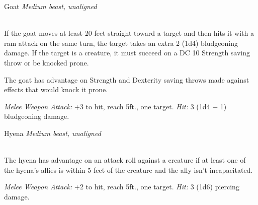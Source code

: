 \documentclass[10pt,twoside,twocolumn,openany]{book}
\begin{document}
\newpage
\begin{monsterboxnobg}{Goat}
	\textit{Medium beast, unaligned}\\
	\hline
	\basics[
		armorclass	= 10,
		hitpoints 		= 4 (1d8),
		speed		= {40 ft.}
	]
	\hline
	\stats[
		STR	= \stat{12},
		DEX	= \stat{10},
		CON	= \stat{11},
		INT	= \stat{2},
		WIS	= \stat{10},
		CHA	= \stat{5}
	]
	\hline
	\details[
		skills			= {},
		senses		= {passive Perception 10},
		languages		= {-},
		challenge		= 0
	]
	\hline \\[1mm]
	\begin{monsteraction}[Charge]
		 If the goat moves at least 20 feet straight toward a target and then hits it with a ram attack on the same turn, the target takes an extra 2 (1d4) bludgeoning damage. If the target is a creature, it must succeed on a DC 10 Strength saving throw or be knocked prone.
	\end{monsteraction}
	
	\begin{monsteraction}
		 The goat has advantage on Strength and Dexterity saving throws made against effects that would knock it prone.
	\end{monsteraction}
	
	\begin{monsteraction}[Ram]
		\textit{Melee Weapon Attack:} +3 to hit, reach 5ft., one target. \textit{Hit:} 3 (1d4 + 1) bludgeoning damage.
	\end{monsteraction}
\end{monsterboxnobg}

\begin{monsterboxnobg}{Hyena}
	\textit{Medium beast, unaligned}\\
	\hline
	\basics[
		armorclass	= 11,
		hitpoints 		= 5 (1d8 + 1),
		speed		= {50 ft.}
	]
	\hline
	\stats[
		STR	= \stat{11},
		DEX	= \stat{13},
		CON	= \stat{12},
		INT	= \stat{2},
		WIS	= \stat{12},
		CHA	= \stat{5}
	]
	\hline
	\details[
		skills			= {Perception +3},
		senses		= {passive Perception 13},
		languages		= {-},
		challenge		= 0
	]
	\hline \\[1mm]
	\begin{monsteraction}
		The hyena has advantage on an attack roll against a creature if at least one of the hyena's allies is within 5 feet of the creature and the ally isn't incapacitated.
	\end{monsteraction}
	\begin{monsteraction}[Bite]
		\textit{Melee Weapon Attack:} +2 to hit, reach 5ft., one target. \textit{Hit:} 3 (1d6) piercing damage.
	\end{monsteraction}
\end{monsterboxnobg}
\end{document}

